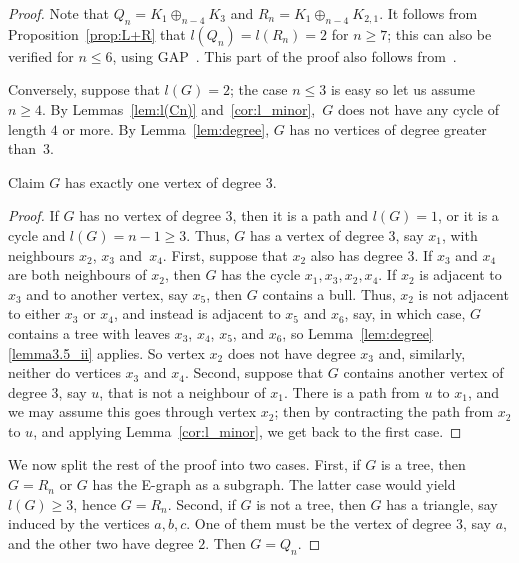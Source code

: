 \documentclass[ALCO,ThmDefs,Unicode,epreuves]{cedram}
\newenvironment{claim}{\begin{enonce}{Claim}}{\end{enonce}}
\begin{document}
\begin{proof}
 Note that $Q_n=K_1\oplus_{n-4}K_3$ and $R_n=K_1\oplus_{n-4}K_{2,1}$. It
 follows from Proposition~\ref{prop:L+R} that $l(Q_n) = l(R_n) = 2$ for
 $n\geq7$; this can also be verified for $n\leq6$, using GAP~\cite{GAP4}. This
 part of the proof also follows from~\cite[Lemma~15]{Horvath2017aa}.

 Conversely, suppose that $l(G) = 2$; the case $n \le 3$ is easy so let us
 assume $n \ge 4$. By Lemmas~\ref{lem:l(Cn)} and~\ref{cor:l_minor},~$G$ does
 not have any cycle of length $4$ or more. By Lemma~\ref{lem:degree}, $G$ has
 no vertices of degree greater than~$3$.

 \begin{claim}
 $G$ has exactly one vertex of degree $3$.
 \end{claim}

 \begin{proof}
 If $G$ has no vertex of degree $3$, then it is a path and $l(G) = 1$, or it
 is a cycle and $l(G) = n-1 \ge 3$. Thus, $G$ has a vertex of degree 3,
 say $x_1$, with neighbours $x_2$, $x_3$ and~$x_4$. First, suppose that $x_2$ also has
 degree 3. If $x_3$ and $x_4$ are both neighbours of $x_2$, then $G$ has the
 cycle $x_1,x_3,x_2,x_4$. If $x_2$ is adjacent to $x_3$ and to another vertex, say $x_5$,
 then $G$ contains a bull. Thus, $x_2$ is not adjacent to either $x_3$ or $x_4$,
 and instead is adjacent to $x_5$ and $x_6$, say, in which case, $G$ contains a tree
 with leaves $x_3$, $x_4$, $x_5$, and $x_6$, so Lemma~\ref{lem:degree}\ref{lemma3.5_ii} applies. 
 So vertex $x_2$ does not have degree $x_3$ and, similarly, neither do vertices $x_3$ and $x_4$.
 Second, suppose that $G$ contains another vertex of degree $3$, say $u$,
 that is not a neighbour of $x_1$. There is a path from $u$ to $x_1$, and we
 may assume this goes through vertex $x_2$; then by contracting the path from
 $x_2$ to $u$, and applying Lemma~\ref{cor:l_minor}, we get back to the first case. 
 \end{proof}

 We now split the rest of the proof into two cases. First, if $G$ is a tree,
 then $G = R_n$ or $G$ has the E-graph as a subgraph. The latter case would
 yield $l(G) \ge 3$, hence $G = R_n$. Second, if $G$ is not a tree, then $G$
 has a triangle, say induced by the vertices $a,b,c$. One of them must
 be the vertex of degree 3, say $a$, and the other two have degree $2$.
 Then $G = Q_n$.
\end{proof}
\end{document}
